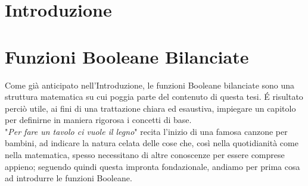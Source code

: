 \documentclass[12pt,a4paper,openright]{report}
\begin{document}
\chapter{Introduzione}
\chapter{Funzioni Booleane Bilanciate}
Come già anticipato nell'Introduzione, le funzioni Booleane bilanciate sono una struttura matematica su cui poggia parte del contenuto di questa tesi.
É risultato perciò utile, ai fini di una trattazione chiara ed esaustiva, impiegare un capitolo per definirne in maniera rigorosa i concetti di base.\\
"\textit{Per fare un tavolo ci vuole il legno}" recita l'inizio di una famosa canzone per bambini, ad indicare la natura celata delle cose che, così nella quotidianità
come nella matematica, spesso necessitano di altre conoscenze per essere comprese appieno; seguendo quindi questa impronta fondazionale, andiamo per prima cosa ad introdurre le funzioni Booleane.
\end{document}
